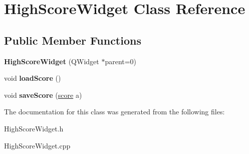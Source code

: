 \hypertarget{classHighScoreWidget}{\section{\-High\-Score\-Widget \-Class \-Reference}
\label{classHighScoreWidget}
}
\subsection*{\-Public \-Member \-Functions}
\begin{DoxyCompactItemize}
\item 
\hypertarget{classHighScoreWidget_a22176799d49cbdea085dada1b3ab1d10}{{\bfseries \-High\-Score\-Widget} (\-Q\-Widget $\ast$parent=0)}\label{classHighScoreWidget_a22176799d49cbdea085dada1b3ab1d10}

\item 
\hypertarget{classHighScoreWidget_a13b7e6f00a5c0464bb765e00ef9da867}{void {\bfseries load\-Score} ()}\label{classHighScoreWidget_a13b7e6f00a5c0464bb765e00ef9da867}

\item 
\hypertarget{classHighScoreWidget_a9b4e90c6e1ebf4f401e1e7dc84955168}{void {\bfseries save\-Score} (\hyperlink{structscore}{score} a)}\label{classHighScoreWidget_a9b4e90c6e1ebf4f401e1e7dc84955168}

\end{DoxyCompactItemize}


\-The documentation for this class was generated from the following files\-:\begin{DoxyCompactItemize}
\item 
\-High\-Score\-Widget.\-h\item 
\-High\-Score\-Widget.\-cpp\end{DoxyCompactItemize}
